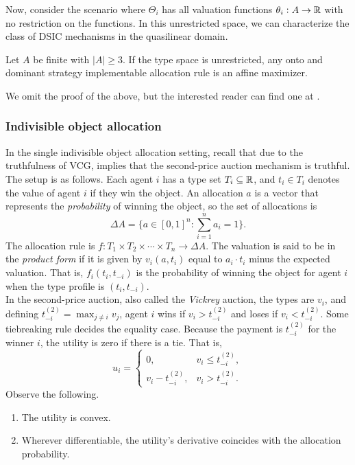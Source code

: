 		Now, consider the scenario where $\Theta_i$ has all valuation functions $\theta_i : A \to \mathbb{R}$ with no restriction on the functions. In this unrestricted space, we can characterize the class of DSIC mechanisms in the quasilinear domain.

		\begin{ftheo}[Roberts]
			Let $A$ be finite with $|A| \ge 3$. If the type space is unrestricted, any onto and dominant strategy implementable allocation rule is an affine maximizer.
		\end{ftheo}

		We omit the proof of the above, but the interested reader can find one at \cite{roberts}.

	\subsubsection{Indivisible object allocation}

		In the single indivisible object allocation setting, recall that due to the truthfulness of VCG,  implies that the second-price auction mechanism is truthful.\\

		The setup is as follows. Each agent $i$ has a type set $T_i \subseteq \mathbb{R}$, and $t_i \in T_i$ denotes the value of agent $i$ if they win the object. An allocation $a$ is a vector that represents the \emph{probability} of winning the object, so the set of allocations is
		\[ \Delta A = \{ a \in [0,1]^n : \sum_{i=1}^n a_i = 1 \}. \]
		The allocation rule is $f : T_1 \times T_2 \times \cdots \times T_n \to \Delta A$. The valuation is said to be in the \emph{product form} if it is given by $v_i(a,t_i)$ equal to $a_i\cdot t_i$ minus the expected valuation. That is, $f_i(t_i,t_{-i})$ is the probability of winning the object for agent $i$ when the type profile is $(t_i,t_{-i})$.\\

		In the second-price auction, also called the \emph{Vickrey} auction, the types are $v_i$, and defining $t_{-i}^{(2)} = \max_{j \ne i} v_j$, agent $i$ wins if $v_i > t_{-i}^{(2)}$ and loses if $v_i < t_{-i}^{(2)}$. Some tiebreaking rule decides the equality case. Because the payment is $t_{-i}^{(2)}$ for the winner $i$, the utility is zero if there is a tie. That is,
		\[ u_i = \begin{cases} 0, & v_i \le t_{-i}^{(2)}, \\ v_i - t_{-i}^{(2)}, & v_i > t_{-i}^{(2)}. \end{cases} \]
		Observe the following.
		\begin{enumerate}
			\item The utility is convex.
			\item Wherever differentiable, the utility's derivative coincides with the allocation probability.
		\end{enumerate}

